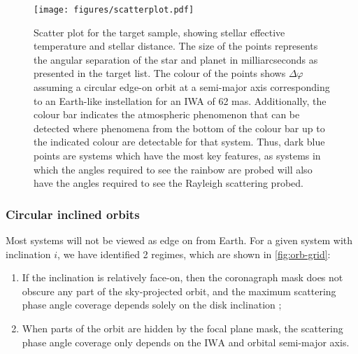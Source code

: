 \documentclass[
    usenatbib,
]{mnras}
\newcommand{\IWA}{\ensuremath{\mathrm{IWA}}}
\begin{document}
\begin{figure*}
    \centering
    \texttt{[image: figures/scatterplot.pdf]}
    \caption{
        Scatter plot for the target sample, showing stellar effective temperature and stellar distance.
        The size of the points represents the angular separation of the star and planet in milliarcseconds as presented in the target list.
        The colour of the points shows $\Delta \varphi$ assuming a circular edge-on orbit at a semi-major axis corresponding to an Earth-like instellation for an IWA of 62 mas.
        Additionally, the colour bar indicates the atmospheric phenomenon that can be detected where phenomena from the bottom of the colour bar up to the indicated colour are detectable for that system.
        Thus, dark blue points are systems which have the most key features, as systems in which the angles required to see the rainbow are probed will also have the angles required to see the Rayleigh scattering probed.
    }
    \label{fig:scatterplot}
\end{figure*}


\subsubsection{Circular inclined orbits}

Most systems will not be viewed as edge on from Earth.
%
For a given system with inclination $i$, we have identified 2 regimes, which are shown in \cref{fig:orb-grid}:

\begin{enumerate}
    \item If the inclination is relatively face-on, then the coronagraph mask does not obscure any part of the sky-projected orbit, and the maximum scattering phase angle coverage depends solely on the disk inclination ;
    \item When parts of the orbit  are hidden by the focal plane mask, the scattering phase angle coverage only depends on the \IWA{} and orbital semi-major axis. 
\end{enumerate}
\end{document}
